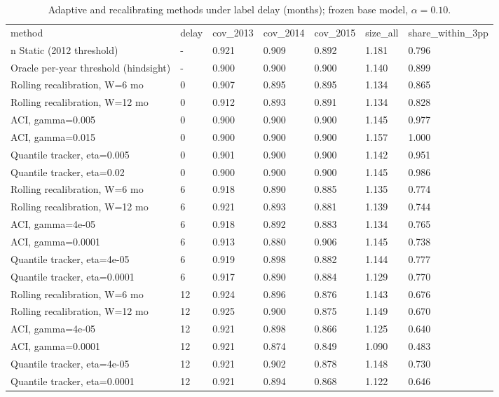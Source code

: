 \begin{table}[t]
\centering
\caption{Adaptive and recalibrating methods under label delay (months); frozen base model, $\alpha=0.10$.}
\label{tab:t2_adaptive_methods}
\begin{tabular}{lllllll}
\toprule
method & delay & cov\_2013 & cov\_2014 & cov\_2015 & size\_all & share\_within\_3pp \\n\midrule
Static (2012 threshold) & - & 0.921 & 0.909 & 0.892 & 1.181 & 0.796 \\
Oracle per-year threshold (hindsight) & - & 0.900 & 0.900 & 0.900 & 1.140 & 0.899 \\
Rolling recalibration, W=6 mo & 0 & 0.907 & 0.895 & 0.895 & 1.134 & 0.865 \\
Rolling recalibration, W=12 mo & 0 & 0.912 & 0.893 & 0.891 & 1.134 & 0.828 \\
ACI, gamma=0.005 & 0 & 0.900 & 0.900 & 0.900 & 1.145 & 0.977 \\
ACI, gamma=0.015 & 0 & 0.900 & 0.900 & 0.900 & 1.157 & 1.000 \\
Quantile tracker, eta=0.005 & 0 & 0.901 & 0.900 & 0.900 & 1.142 & 0.951 \\
Quantile tracker, eta=0.02 & 0 & 0.900 & 0.900 & 0.900 & 1.145 & 0.986 \\
Rolling recalibration, W=6 mo & 6 & 0.918 & 0.890 & 0.885 & 1.135 & 0.774 \\
Rolling recalibration, W=12 mo & 6 & 0.921 & 0.893 & 0.881 & 1.139 & 0.744 \\
ACI, gamma=4e-05 & 6 & 0.918 & 0.892 & 0.883 & 1.134 & 0.765 \\
ACI, gamma=0.0001 & 6 & 0.913 & 0.880 & 0.906 & 1.145 & 0.738 \\
Quantile tracker, eta=4e-05 & 6 & 0.919 & 0.898 & 0.882 & 1.144 & 0.777 \\
Quantile tracker, eta=0.0001 & 6 & 0.917 & 0.890 & 0.884 & 1.129 & 0.770 \\
Rolling recalibration, W=6 mo & 12 & 0.924 & 0.896 & 0.876 & 1.143 & 0.676 \\
Rolling recalibration, W=12 mo & 12 & 0.925 & 0.900 & 0.875 & 1.149 & 0.670 \\
ACI, gamma=4e-05 & 12 & 0.921 & 0.898 & 0.866 & 1.125 & 0.640 \\
ACI, gamma=0.0001 & 12 & 0.921 & 0.874 & 0.849 & 1.090 & 0.483 \\
Quantile tracker, eta=4e-05 & 12 & 0.921 & 0.902 & 0.878 & 1.148 & 0.730 \\
Quantile tracker, eta=0.0001 & 12 & 0.921 & 0.894 & 0.868 & 1.122 & 0.646 \\
\bottomrule
\end{tabular}
\end{table}
